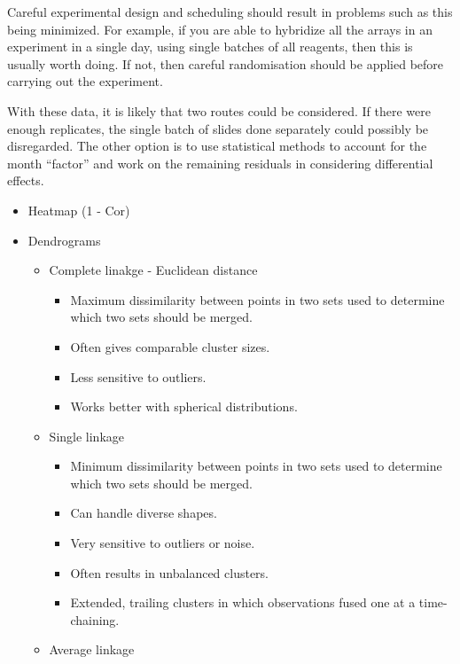 \documentclass[
]{book}
\begin{document}
\begin{enumerate}
  Careful experimental design and scheduling should result in problems such as this being minimized. For example, if you are able to hybridize all the arrays in an experiment in a single day, using single batches of all reagents, then this is usually worth doing. If not, then careful randomisation should be applied before carrying out the experiment.

  With these data, it is likely that two routes could be considered. If there were enough replicates, the single batch of slides done separately could possibly be disregarded. The other option is to use statistical methods to account for the month ``factor'' and work on the remaining residuals in considering differential effects.

  \begin{itemize}
  \item
    Heatmap (1 - Cor)
  \item
    Dendrograms

    \begin{itemize}
    \item
      Complete linakge - Euclidean distance

      \begin{itemize}
      \item
        Maximum dissimilarity between points in two sets used to determine which two sets should be merged.
      \item
        Often gives comparable cluster sizes.
      \item
        Less sensitive to outliers.
      \item
        Works better with spherical distributions.
      \end{itemize}
    \item
      Single linkage

      \begin{itemize}
      \item
        Minimum dissimilarity between points in two sets used to determine which two sets should be merged.
      \item
        Can handle diverse shapes.
      \item
        Very sensitive to outliers or noise.
      \item
        Often results in unbalanced clusters.
      \item
        Extended, trailing clusters in which observations fused one at a time-chaining.
      \end{itemize}
    \item
      Average linkage


\end{itemize}
\end{itemize}
\end{enumerate}
\end{document}
